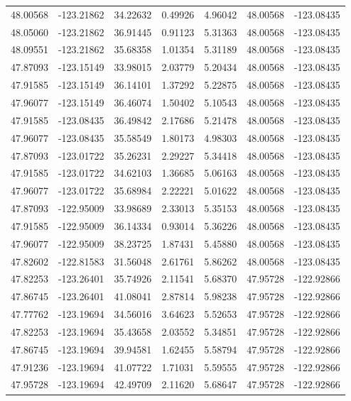 \documentclass[draft]{agujournal2019}
\begin{document}
\begin{center}
\begin{longtable}{c c c c c c c}
48.00568 & -123.21862 & 34.22632 & 0.49926 & 4.96042 & 48.00568 & -123.08435 \\
48.05060 & -123.21862 & 36.91445 & 0.91123 & 5.31363 & 48.00568 & -123.08435 \\
48.09551 & -123.21862 & 35.68358 & 1.01354 & 5.31189 & 48.00568 & -123.08435 \\
47.87093 & -123.15149 & 33.98015 & 2.03779 & 5.20434 & 48.00568 & -123.08435 \\
47.91585 & -123.15149 & 36.14101 & 1.37292 & 5.22875 & 48.00568 & -123.08435 \\
47.96077 & -123.15149 & 36.46074 & 1.50402 & 5.10543 & 48.00568 & -123.08435 \\
47.91585 & -123.08435 & 36.49842 & 2.17686 & 5.21478 & 48.00568 & -123.08435 \\
47.96077 & -123.08435 & 35.58549 & 1.80173 & 4.98303 & 48.00568 & -123.08435 \\
47.87093 & -123.01722 & 35.26231 & 2.29227 & 5.34418 & 48.00568 & -123.08435 \\
47.91585 & -123.01722 & 34.62103 & 1.36685 & 5.06163 & 48.00568 & -123.08435 \\
47.96077 & -123.01722 & 35.68984 & 2.22221 & 5.01622 & 48.00568 & -123.08435 \\
47.87093 & -122.95009 & 33.98689 & 2.33013 & 5.35153 & 48.00568 & -123.08435 \\
47.91585 & -122.95009 & 36.14334 & 0.93014 & 5.36226 & 48.00568 & -123.08435 \\
47.96077 & -122.95009 & 38.23725 & 1.87431 & 5.45880 & 48.00568 & -123.08435 \\
47.82602 & -122.81583 & 31.56048 & 2.61761 & 5.86262 & 48.00568 & -123.08435 \\
47.82253 & -123.26401 & 35.74926 & 2.11541 & 5.68370 & 47.95728 & -122.92866 \\
47.86745 & -123.26401 & 41.08041 & 2.87814 & 5.98238 & 47.95728 & -122.92866 \\
47.77762 & -123.19694 & 34.56016 & 3.64623 & 5.52653 & 47.95728 & -122.92866 \\
47.82253 & -123.19694 & 35.43658 & 2.03552 & 5.34851 & 47.95728 & -122.92866 \\
47.86745 & -123.19694 & 39.94581 & 1.62455 & 5.58794 & 47.95728 & -122.92866 \\
47.91236 & -123.19694 & 41.07722 & 1.71031 & 5.59555 & 47.95728 & -122.92866 \\
47.95728 & -123.19694 & 42.49709 & 2.11620 & 5.68647 & 47.95728 & -122.92866 \\

\end{longtable}
\end{center}
\end{document}
